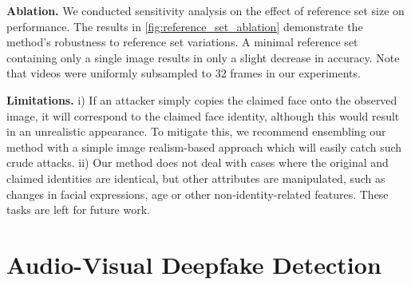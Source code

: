 \documentclass{article} \usepackage{iclr2024_conference,times}
\begin{document}
\textbf{Ablation.} We conducted sensitivity analysis on the effect of reference set size on performance. The results in \cref{fig:reference_set_ablation} demonstrate the method's robustness to reference set variations. A minimal reference set containing only a single image results in only a slight decrease in accuracy. Note that videos were uniformly subsampled to $32$ frames in our experiments.

\textbf{Limitations.} i) If an attacker simply copies the claimed face onto the observed image, it will correspond to the claimed face identity, although this would result in an unrealistic appearance. To mitigate this, we recommend ensembling our method with a simple image realism-based approach which will easily catch such crude attacks. ii) Our method does not deal with cases where the original and claimed identities are identical, but other attributes are manipulated, such as changes in facial expressions, age or other non-identity-related features. These tasks are left for future work.

\section{Audio-Visual Deepfake Detection}
\label{sec:audio-visual}
\end{document}
